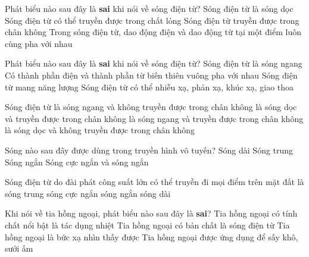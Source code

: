 \begin{ex}%
Phát biểu nào sau đây là \textbf{sai} khi nói về sóng điện từ?
\choice
{\True Sóng điện từ là sóng dọc}
{Sóng điện từ có thể truyền được trong chất lỏng}
{Sóng điện từ truyền được trong chân không}
{Trong sóng điện từ, dao động điện và dao động từ tại một điểm luôn cùng pha với nhau}
\end{ex} 
\begin{ex}%
Phát biểu nào sau đây là \textbf{sai} khi nói về sóng điện từ?                                                                                                                                   
\choice
{Sóng điện từ là sóng ngang} 
{\True Có thành phần điện và thành phần từ biến thiên vuông pha với nhau}
{Sóng điện từ mang năng lượng}
{Sóng điện từ có thể nhiễu xạ, phản xạ, khúc xạ, giao thoa}
\end{ex} 
\begin{ex}%
 Sóng điện từ
\choice
{là sóng ngang và không truyền được trong chân không}
{là sóng dọc và truyền được trong chân không}
{\True là sóng ngang và truyền được trong chân không}
{là sóng dọc và không truyền được trong chân không}
\end{ex} 
\begin{ex}%
Sóng nào sau đây được dùng trong truyền hình vô tuyến?
\choice
{Sóng dài}
{Sóng trung}
{Sóng ngắn}
{\True Sóng cực ngắn và sóng ngắn}
\end{ex} 
\begin{ex}%
Sóng điện từ do đài phát công suất lớn có thể truyền đi mọi điểm trên mặt đất là
\choice
{sóng trung}
{sóng cực ngắn}
{\True sóng ngắn}
{sóng dài}
\end{ex} 
\begin{ex}%
 Khi nói về tia hồng ngoại, phát biểu nào sau đây là \textbf{sai}?
\choice
{Tia hồng ngoại có tính chất nổi bật là tác dụng nhiệt}
{Tia hồng ngoại có bản chất là sóng điện từ}
{\True Tia hồng ngoại là bức xạ nhìn thấy được}
{Tia hồng ngoại được ứng dụng để sấy khô, sưởi ấm}
\end{ex} 
